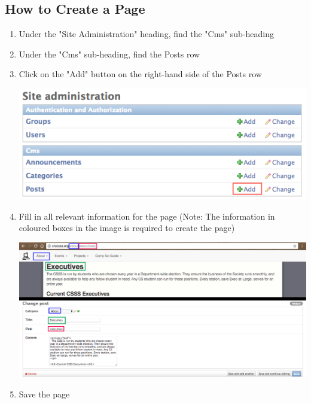 \documentclass{article}
\begin{document}
\subsection*{How to Create a Page}
\begin{enumerate}
	\item Under the "Site Administration" heading, find the "Cms" sub-heading
	\item Under the "Cms" sub-heading, find the Posts row
	\item Click on the "Add" button on the right-hand side of the Posts row
	
	\includegraphics[scale=0.45]{posts-picture1.png}
	
	\pagebreak
	
	\item Fill in all relevant information for the page (Note: The information in coloured boxes in the image is required to create the page)
	
	\includegraphics[scale=0.40]{Posts.jpg}
	
	\item Save the page
	
\end{enumerate}
\end{document}
